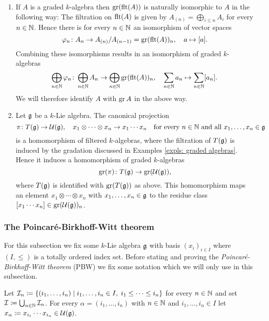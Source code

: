 \begin{expls}
 \begin{enumerate}[leftmargin=*]
  \item
   If $A$ is a graded $k$-algebra then $\operatorname{gr}(\operatorname{flt}(A))$ is naturally isomorphic to $A$ in the following way: The filtration on $\operatorname{flt}(A)$ is given by $A_{(n)} = \bigoplus_{i \leq n} A_i$ for every $n \in \mathbb{N}$. Hence there is for every $n \in \mathbb{N}$ an isomorphism of vector spaces
   \[
    \varphi_n \colon A_n \to A_{(n)}/A_{(n-1)} = \operatorname{gr}(\operatorname{flt}(A))_n, \quad a \mapsto [a].
   \]
   Combining these isomorphisms results in an isomorphism of graded $k$-algebras
   \[
    \bigoplus_{n \in \mathbb{N}} \varphi_n \colon
    \bigoplus_{n \in \mathbb{N}} A_n \to \bigoplus_{n \in \mathbb{N}} \operatorname{gr}(\operatorname{flt}(A))_n, \quad
    \sum_{n \in \mathbb{N}} a_n \mapsto \sum_{n \in \mathbb{N}} [a_n].
   \]
   We will therefore identify $A$ with $\operatorname{gr} A$ in the above way.
  \item
   Let $\mathfrak{g}$ be a $k$-Lie algebra. The canonical projection
   \[
    \pi \colon T(\mathfrak{g}) \to \mathcal{U}(\mathfrak{g}), \quad x_1 \otimes \dotsb \otimes x_n \to x_1 \dotsm x_n
    \quad \text{for every $n \in \mathbb{N}$ and all $x_1, \dotsc, x_n \in \mathfrak{g}$}
   \]
   is a homomorphism of filtered $k$-algebras, where the filtration of $T(\mathfrak{g})$ is induced by the gradation discussed in Examples \ref{expls: graded algebras}. Hence it induces a homomorphism of graded $k$-algebras
   \[
    \operatorname{gr}(\pi) \colon T(\mathfrak{g}) \to \operatorname{gr}(\mathcal{U}(\mathfrak{g})),
   \]
   where $T(\mathfrak{g})$ is identified with $\operatorname{gr}(T(\mathfrak{g}))$ as above. This homomorphism maps an element $x_1 \otimes \dotsb \otimes x_n$ with $x_1, \dots, x_n \in \mathfrak{g}$ to the residue class $[x_1 \dotsm x_n] \in \operatorname{gr}(\mathcal{U}(\mathfrak{g}))_n$.
 \end{enumerate}
\end{expls}



\subsubsection{The Poincar\'{e}-Birkhoff-Witt theorem}
For this subsection we fix some $k$-Lie algebra $\mathfrak{g}$ with basis $(x_i)_{i \in I}$ where $(I, \leq)$ is a totally ordered index set. Before stating and proving the \emph{Poincar\'{e}-Birkhoff-Witt theorem} (PBW) we fix some notation which we will only use in this subsection.


\begin{defi}
 Let $\mathcal{I}_n \coloneqq \{(i_1, \dotsc, i_n) \mid i_1, \dotsc, i_n \in I, \; i_1 \leq \dotsb \leq i_n\}$ for every $n \in \mathbb{N}$ and set $\mathcal{I} \coloneqq \bigcup_{n \in \mathbb{N}} \mathcal{I}_n$. For every $\alpha = (i_1, \dotsc, i_n)$ with $n \in \mathbb{N}$ and $i_1, \dotsc, i_n \in I$ let $x_\alpha \coloneqq x_{i_1} \dotsm x_{i_n} \in \mathcal{U}(\mathfrak{g})$.
\end{defi}



